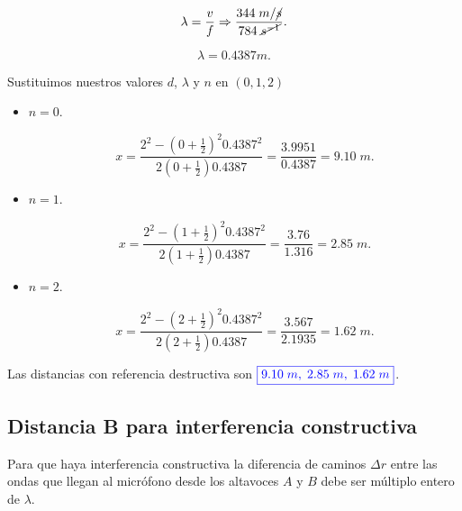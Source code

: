 \documentclass[a4paper,12pt]{article} %
\begin{document}
\[ \lambda = \frac{v}{f} \Rightarrow \frac{344 \; m/\cancel{s}}{784 \; \cancel{s^{-1}}}.\]

\vspace{\baselineskip}

\[ \lambda = 0.4387m. \]

\begin{justify}
    Sustituimos nuestros valores \(d\), \(\lambda\) y \(n\) en \((0,1,2)\) 
\end{justify}

\vspace{\baselineskip}

\begin{itemize}
    \item \(n = 0.\)
    
        \[x = \frac{2^2 - \left(0 + \frac{1}{2}\right)^2 0.4387^2 }{2\left(0 + \frac{1}{2}\right) 0.4387} = \frac{3.9951}{0.4387} = 9.10 \; m. \]
    
    \item \(n = 1.\)
    
    \[x = \frac{2^2 - \left(1 + \frac{1}{2}\right)^2 0.4387^2 }{2\left(1 + \frac{1}{2}\right) 0.4387} = \frac{3.76}{1.316} =  2.85  \; m. \]

    \item \(n = 2.\)
    
    \[x = \frac{2^2 - \left(2 + \frac{1}{2}\right)^2 0.4387^2 }{2\left(2 + \frac{1}{2}\right) 0.4387} = \frac{3.567}{2.1935} = 1.62 \; m. \]

\end{itemize}

\vspace{\baselineskip}

\begin{justify}
    Las distancias con referencia destructiva son \(\textcolor{blue}{\boxed{9.10 \; m, \; 2.85 \; m, \; 1.62 \; m}}\).
\end{justify}

\vspace{\baselineskip}


\subsection{Distancia B para interferencia constructiva}

\begin{justify}
    Para que haya interferencia constructiva la diferencia de caminos \( \Delta r\)  entre las ondas que llegan al micrófono desde los altavoces 
    \(A\) y \(B\) debe ser múltiplo entero de \(\lambda\). 
\end{justify}
\end{document}
